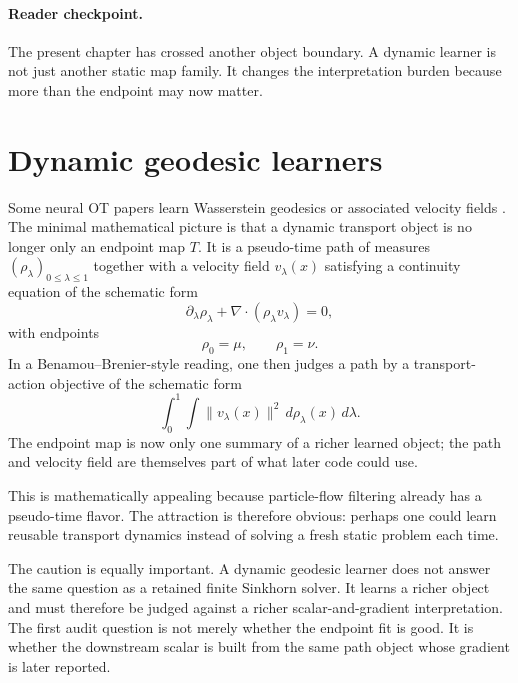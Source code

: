\paragraph{Reader checkpoint.}
The present chapter has crossed another object boundary.  A dynamic learner is
not just another static map family.  It changes the interpretation burden because
more than the endpoint may now matter.

\section{Dynamic geodesic learners}
\label{sec:bf-neural-ot-dynamic-geodesic}

Some neural OT papers learn Wasserstein geodesics or associated velocity fields
\citep{hanebeck2023progressiveot,gracykchen2024geonet,liuchen2026wgsolver}.  The
minimal mathematical picture is that a dynamic transport object is no longer only
an endpoint map \(T\).  It is a pseudo-time path of measures \((\rho_\lambda)_{0\le
\lambda\le 1}\) together with a velocity field \(v_\lambda(x)\) satisfying a
continuity equation of the schematic form
\begin{equation}
\label{eq:bf-neural-ot-dynamic-continuity}
  \partial_\lambda \rho_\lambda
  +
  \nabla\cdot(\rho_\lambda v_\lambda)
  =0,
\end{equation}
with endpoints
\begin{equation}
\label{eq:bf-neural-ot-dynamic-endpoints}
  \rho_0=\mu,
  \qquad
  \rho_1=\nu.
\end{equation}
In a Benamou--Brenier-style reading, one then judges a path by a transport-action
objective of the schematic form
\begin{equation}
\label{eq:bf-neural-ot-dynamic-action}
  \int_0^1 \int \|v_\lambda(x)\|^2\,d\rho_\lambda(x)\,d\lambda.
\end{equation}
The endpoint map is now only one summary of a richer learned object; the path and
velocity field are themselves part of what later code could use.

This is mathematically appealing because particle-flow filtering already has a
pseudo-time flavor.  The attraction is therefore obvious: perhaps one could learn
reusable transport dynamics instead of solving a fresh static problem each time.

The caution is equally important.  A dynamic geodesic learner does not answer the
same question as a retained finite Sinkhorn solver.  It learns a richer object and
must therefore be judged against a richer scalar-and-gradient interpretation.  The
first audit question is not merely whether the endpoint fit is good.  It is whether
the downstream scalar is built from the same path object whose gradient is later
reported.

